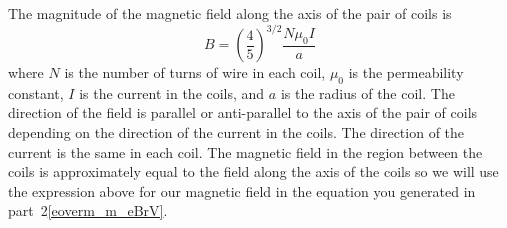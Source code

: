 The magnitude of the magnetic field along the axis of the pair of coils is
\begin{equation}
B = \left ( \frac{4}{5} \right )^{3/2} \frac{N \mu_0 I}{a}
\end{equation}
where $N$ is the number of turns of wire in each coil, $\mu_0$
is the permeability constant,  $I$ is the current in the coils,
and $a$ is the radius of the coil.
The direction of the field is parallel or anti-parallel
to the axis of the pair of coils depending on the direction of the current
in the coils.
The direction of the current is the same in each coil.
The magnetic field in the region between the coils is approximately equal
to the field along the axis of the coils so we will use
the expression above for our magnetic field in the equation you generated in
part~2\ref{eoverm_m_eBrV}.

\bigskip

